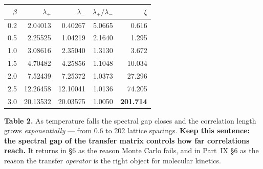 \begin{center}\small
\begin{tabular}{@{}rrrrr@{}}
\toprule
\rowcolor{ember!13}
$\beta$ & $\lambda_+$ & $\lambda_-$ & $\lambda_+/\lambda_-$ & $\xi$\\
\midrule
0.2 & 2.04013 & 0.40267 & 5.0665 & 0.616\\
0.5 & 2.25525 & 1.04219 & 2.1640 & 1.295\\
1.0 & 3.08616 & 2.35040 & 1.3130 & 3.672\\
1.5 & 4.70482 & 4.25856 & 1.1048 & 10.034\\
2.0 & 7.52439 & 7.25372 & 1.0373 & 27.296\\
2.5 & 12.26458 & 12.10041 & 1.0136 & 74.205\\
\rowcolor{alert!8}
3.0 & 20.13532 & 20.03575 & 1.0050 & \textbf{201.714}\\
\bottomrule
\end{tabular}
\end{center}
\vspace{-2pt}
\begin{center}\begin{minipage}{0.93\textwidth}\footnotesize\color{slate}
\textbf{Table 2.}\; As temperature falls the spectral gap closes and the correlation length grows
\emph{exponentially} --- from 0.6 to 202 lattice spacings. \textbf{Keep this sentence: the spectral
gap of the transfer matrix controls how far correlations reach.} It returns in §6 as the reason Monte
Carlo fails, and in Part~IX §6 as the reason the transfer \emph{operator} is the right object for
molecular kinetics.
\end{minipage}\end{center}
